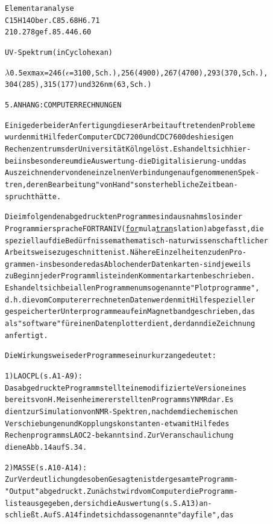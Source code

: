 \documentclass[a4paper,11pt]{article}
\begin{document}
\begin{alltt}
Elementaranalyse
C15H14O   ber.    C  85.68   H  6.71
210.278   gef.       85.44      6.60

UV-Spektrum (in Cyclohexan)

\(\lambda\)\lower0.5ex\hbox{max} = 246 (\(\epsilon\) = 3100, Sch.), 256 (4900), 267 (4700), 293 (370, Sch.),
             304 (285), 315 (177) und 326 nm (63, Sch.)

\newpage
{}


5. ANHANG: COMPUTERRECHNUNGEN


Einige der bei der Anfertigung dieser Arbeit auftretenden Probleme
wurden mit Hilfe der Computer CDC 7200 und CDC 7600 des hiesigen
Rechenzentrums der Universität Köln gelöst. Es handelt sich hier-
bei insbesondere um die Auswertung - die Digitalisierung - und das
Auszeichnen der von den einzelnen Verbindungen aufgenommenen Spek-
tren, deren Bearbeitung "von Hand" sonst erhebliche Zeit bean-
sprucht hätte.

Die im folgenden abgedruckten Programme sind ausnahmslos in der
Programmiersprache FORTRAN IV (\underline{for}mula \underline{tran}slation) abgefasst, die
speziell auf die Bedürfnisse mathematisch-naturwissenschaftlicher
Arbeitsweise zugeschnitten ist. Nähere Einzelheiten zu den Pro-
grammen - insbesondere das Ablochen der Datenkarten - sind jeweils
zu Beginn jeder Programmliste in den Kommentarkarten beschrieben.
Es handelt sich bei allen Programmen um sogenannte "Plotprogramme",
d.h. die vom Computer errechneten Daten werden mit Hilfe spezieller
gespeicherter Unterprogramme auf ein Magnetband geschrieben, das
als "software" für einen Datenplotter dient, der dann die Zeichnung
anfertigt.

Die Wirkungsweise der Programme sei nur kurz angedeutet:

1) LAOCPL (s. A 1 - A 9):
   Das abgedruckte Programm stellt eine modifizierte Version eines
   bereits von H. Meisenheimer erstellten Programms YNMR dar. Es
   dient zur Simulation von NMR-Spektren, nachdem die chemischen
   Verschiebungen und Kopplungskonstanten - etwa mit Hilfe des
   Rechenprogramms LAOC2 - bekannt sind. Zur Veranschaulichung
   diene Abb. 14 auf S. 34.

2) MASSE (s. A 10 - A 14):
   Zur Verdeutlichung des oben Gesagten ist der gesamte Programm-
   "Output" abgedruckt. Zunächst wird vom Computer die Programm-
   liste ausgegeben, der sich die Auswertung (s. S. A 13) an-
   schließt. Auf S. A 14 findet sich das sogenannte "dayfile", das
\newpage
{}



\end{alltt}
\end{document}
